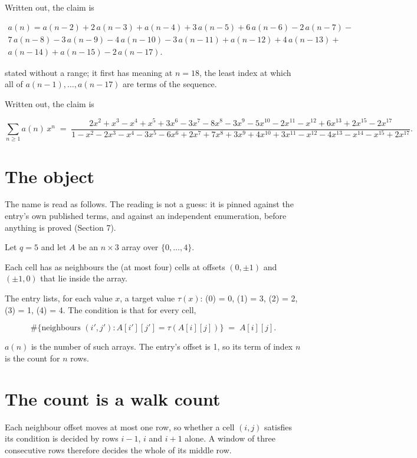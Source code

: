 \documentclass[11pt]{article}
\theoremstyle{definition}
\begin{document}
Written out, the claim is

\begin{multline*} a(n) = a(n-2) + 2\,a(n-3) + a(n-4) + 3\,a(n-5) + 6\,a(n-6) - 2\,a(n-7) - \\ 7\,a(n-8) - 3\,a(n-9) - 4\,a(n-10) - 3\,a(n-11) + a(n-12) + 4\,a(n-13) + \\ a(n-14) + a(n-15) - 2\,a(n-17). \end{multline*}

stated without a range; it first has meaning at $n = 18$, the least index at which all of $a(n-1),\dots,a(n-17)$ are terms of the sequence.

Written out, the claim is

\[\sum_{n \ge 1} a(n)\,x^n \;=\; \frac{2x^{2} + x^{3} - x^{4} + x^{5} + 3x^{6} - 3x^{7} - 8x^{8} - 3x^{9} - 5x^{10} - 2x^{11} - x^{12} + 6x^{13} + 2x^{15} - 2x^{17}}{1 - x^{2} - 2x^{3} - x^{4} - 3x^{5} - 6x^{6} + 2x^{7} + 7x^{8} + 3x^{9} + 4x^{10} + 3x^{11} - x^{12} - 4x^{13} - x^{14} - x^{15} + 2x^{17}}.\]

\section{The object}

The name is read as follows. The reading is not a guess: it is pinned against the entry's own published terms, and against an independent enumeration, before anything is proved (Section 7).

Let $q = 5$ and let $A$ be an $n \times 3$ array over $\{0,\dots,4\}$.

Each cell has as neighbours the (at most four) cells at offsets $(0,\pm1)$ and $(\pm1,0)$ that lie inside the array.

The entry lists, for each value $x$, a target value $\tau(x)$: \tau(0) = 0, \tau(1) = 3, \tau(2) = 2, \tau(3) = 1, \tau(4) = 4. The condition is that for every cell,

\[\#\{\text{neighbours } (i',j') : A[i'][j'] = \tau(A[i][j])\} \;=\; A[i][j].\]

$a(n)$ is the number of such arrays. The entry's offset is 1, so its term of index $n$ is the count for $n$ rows.

\section{The count is a walk count}

Each neighbour offset moves at most one row, so whether a cell $(i,j)$ satisfies its condition is decided by rows $i-1$, $i$ and $i+1$ alone. A window of three consecutive rows therefore decides the whole of its middle row.
\end{document}
